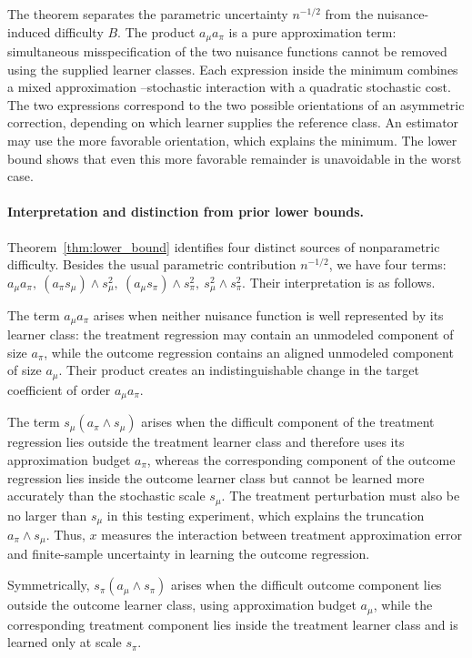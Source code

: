 \documentclass[11pt]{article}
\begin{document}
The theorem separates the parametric uncertainty \(n^{-1/2}\) from the
nuisance-induced difficulty \(B\).  The product \(a_\mu a_\pi\) is a pure
approximation term: simultaneous misspecification of the two nuisance
functions cannot be removed using the supplied learner classes.  Each
expression inside the minimum combines a mixed approximation
–stochastic interaction with a quadratic stochastic cost.  The two expressions
correspond to the two possible orientations of an asymmetric correction,
depending on which learner supplies the reference class.  An estimator may
use the more favorable orientation, which explains the minimum.  The lower
bound shows that even this more favorable remainder is unavoidable in the
worst case.

\paragraph{Interpretation and distinction from prior lower bounds.}
Theorem~\ref{thm:lower_bound} identifies four distinct sources of
nonparametric difficulty.  Besides the usual parametric contribution
$n^{-1/2}$, we have four terms:
$a_\mu a_\pi,\ (a_\pi s_\mu)\wedge s_\mu^2,\ (a_\mu s_\pi)\wedge s_\pi^2,\ s_\mu^2\wedge s_\pi^2$. Their interpretation is as follows.

The term
\(a_\mu a_\pi\) arises when neither nuisance function is well represented by
its learner class: the treatment regression may contain an unmodeled component
of size \(a_\pi\), while the outcome regression contains an aligned unmodeled
component of size \(a_\mu\).  Their product creates an indistinguishable change
in the target coefficient of order \(a_\mu a_\pi\). 

The term $s_\mu(a_\pi\wedge s_\mu)$
arises when the difficult component of the treatment regression lies outside
the treatment learner class and therefore uses its approximation budget
\(a_\pi\), whereas the corresponding component of the outcome regression lies
inside the outcome learner class but cannot be learned more accurately than
the stochastic scale \(s_\mu\).  The treatment perturbation must also be no
larger than \(s_\mu\) in this testing experiment, which explains the truncation
\(a_\pi\wedge s_\mu\).  Thus, \(x\) measures the interaction between treatment
approximation error and finite-sample uncertainty in learning the outcome
regression. 

Symmetrically, $s_\pi(a_\mu\wedge s_\pi)$
arises when the difficult outcome component lies outside the outcome learner
class, using approximation budget \(a_\mu\), while the corresponding treatment
component lies inside the treatment learner class and is learned only at scale \(s_\pi\). 
\end{document}
